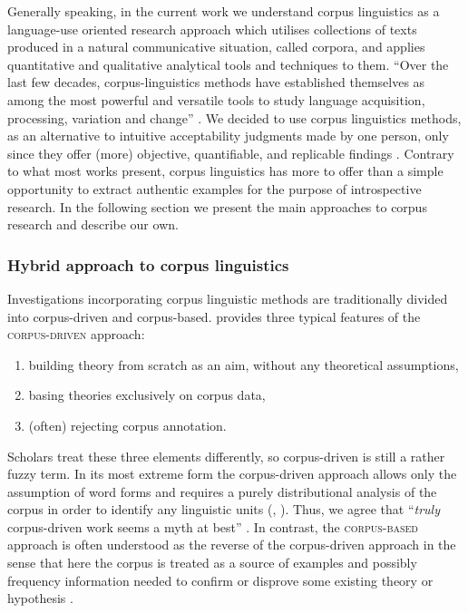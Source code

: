 Generally speaking, in the current work we understand corpus linguistics as a language-use oriented research approach which utilises collections of texts produced in a natural communicative situation, called corpora, and applies quantitative and qualitative analytical tools and techniques to them. ``Over the last few decades, corpus-linguistics methods have established themselves as among the most powerful and versatile tools to study language acquisition, processing, variation and change'' \citep[257]{GriesNewman13}. We decided to use corpus linguistics methods, as an alternative to intuitive acceptability judgments made by one person, only since they offer (more) objective, quantifiable, and replicable findings \citep[cf.][257]{GriesNewman13}. Contrary to what most works \citep{THG05} present, corpus linguistics has more to offer than a simple opportunity to extract authentic examples for the purpose of introspective research. In the following section we present the main approaches to corpus research and describe our own.

\subsubsection{Hybrid approach to corpus linguistics}

Investigations incorporating corpus linguistic methods are traditionally divided into corpus-driven and corpus-based. \citet[328]{Gries10} provides three typical features of the \textsc{corpus-driven} approach:

\begin{enumerate}
\item building theory from scratch as an aim, without any theoretical assumptions,
\item basing theories exclusively on corpus data,
\item (often) rejecting corpus annotation.
\end{enumerate}

Scholars treat these three elements differently, so corpus-driven is still a rather fuzzy term. In its most extreme form the corpus-driven approach allows only the assumption of word forms and requires a purely distributional analysis of the corpus in order to identify any linguistic units (\citealt[cf.][329]{Gries10}, \citealt[201]{Biber15}). Thus, we agree that ``\textit{truly} corpus-driven work seems a myth at best'' \citep[330]{Gries10}. In contrast, the \textsc{corpus-based} approach is often understood as the reverse of the corpus-driven approach in the sense that here the corpus is treated as a source of examples and possibly frequency information needed to confirm or disprove some existing theory or hypothesis \citep[cf.][15]{Meyer14}.  

